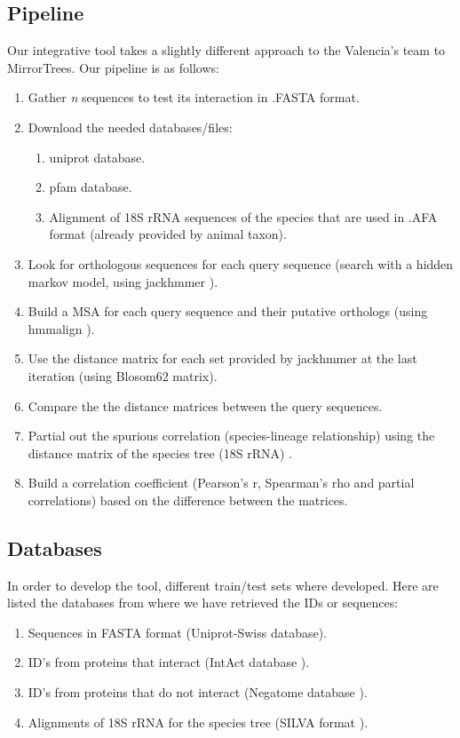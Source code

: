\documentclass[11pt]{article}
\begin{document}
\subsection{Pipeline}
Our integrative tool takes a slightly different approach to the Valencia's team to MirrorTrees. Our pipeline is as follows:
\begin{enumerate}
\setlength{\itemsep}{1pt}
	\item Gather \textit{n} sequences to test its interaction in .FASTA format.
	\item Download the needed databases/files:
	\begin{enumerate}
	\setlength{\itemsep}{1pt}
		\item uniprot database.
		\item pfam database.
		\item Alignment of 18S rRNA sequences of the species that are used in .AFA format (already provided by animal taxon).
	\end{enumerate}
	\item Look for orthologous sequences for each query sequence (search with a hidden markov model, using jackhmmer \cite{HMMER}).
	\item Build a MSA for each query sequence and their putative orthologs (using hmmalign \cite{HMMER}).
	\item Use the distance matrix for each set provided by jackhmmer at the last iteration \cite{HMMER} (using Blosom62 matrix).
	\item Compare the the distance matrices between the query sequences.
	\item Partial out the spurious correlation (species-lineage relationship) using the distance matrix of the species tree (18S rRNA) \cite{Sato2005}.	
	\item Build a correlation coefficient (Pearson's r, Spearman's rho and partial correlations) based on the difference between the matrices.
\end{enumerate}

\subsection{Databases}
In order to develop the tool, different train/test sets where developed. Here are listed the databases from where we have retrieved the IDs or sequences:
\begin{enumerate}
\setlength{\itemsep}{1pt}
	\item Sequences in FASTA format (Uniprot-Swiss database).
	\item ID's from proteins that interact (IntAct database \cite{intact}).
	\item ID's from proteins that do not interact (Negatome database \cite{negatome}).
	\item Alignments of 18S rRNA for the species tree (SILVA format \cite{SILVA}).
\end{enumerate}
\end{document}
